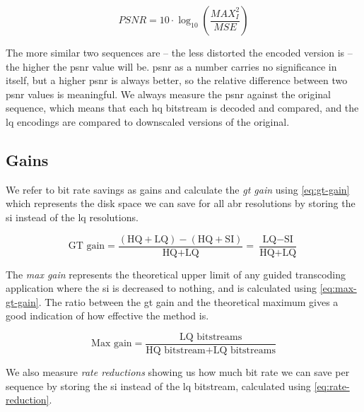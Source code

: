 \begin{equation}
\label{eq:psnr}
PSNR = 10 \cdot \log_{10} \left( \frac{\mathit{MAX}_I^2}{\mathit{MSE}} \right)
\end{equation}

The more similar two sequences are -- the less distorted the encoded version is -- the higher the \gls{psnr} value will be. \gls{psnr} as a number carries no significance in itself, but a higher \gls{psnr} is always better, so the relative difference between two \gls{psnr} values is meaningful. We always measure the \gls{psnr} against the original sequence, which means that each \gls{hq} bitstream is decoded and compared, and the \gls{lq} encodings are compared to downscaled versions of the original.


\subsection{Gains}
We refer to bit rate savings as gains and calculate the \textit{\gls{gt} gain} using \cref{eq:gt-gain} which represents the disk space we can save for all \gls{abr} resolutions by storing the \gls{si} instead of the \gls{lq} resolutions.

\begin{equation}
\label{eq:gt-gain}
\text{GT gain} = \frac{(\text{HQ} + \text{LQ}) - (\text{HQ} + \text{SI})}{\text{HQ} + \text{LQ}} = \frac{\text{LQ} - \text{SI}}{\text{HQ} + \text{LQ}}
\end{equation}
\vspace{0.2em}

The \textit{max gain} represents the theoretical upper limit of any guided transcoding application where the \gls{si} is decreased to nothing, and is calculated using \cref{eq:max-gt-gain}. The ratio between the \gls{gt} gain and the theoretical maximum gives a good indication of how effective the method is.

\begin{equation}
\label{eq:max-gt-gain}
\text{Max gain} = \frac{\text{LQ bitstreams}}{\text{HQ bitstream} + \text{LQ bitstreams}}
\end{equation}
\vspace{0.2em}

We also measure \textit{rate reductions} showing us how much bit rate we can save per sequence by storing the \gls{si} instead of the \gls{lq} bitstream, calculated using \cref{eq:rate-reduction}.

